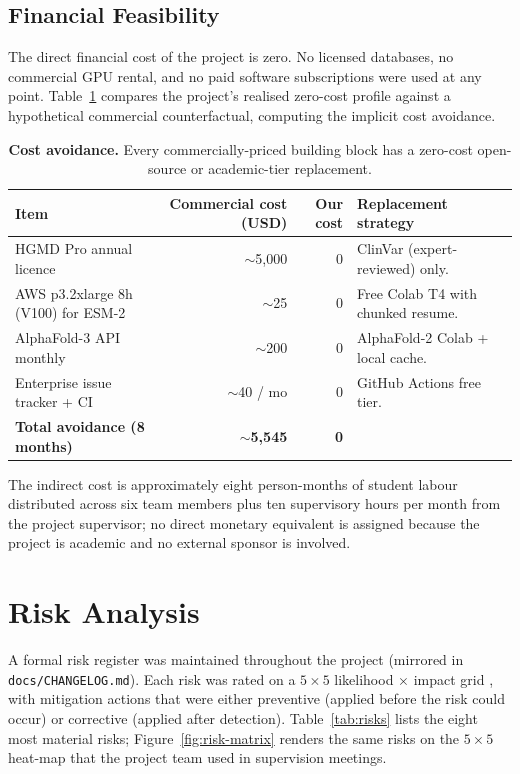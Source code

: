 \documentclass[11pt,a4paper,oneside]{report}
\begin{document}
\subsection{Financial Feasibility}
\label{sec:feas-fin}

The direct financial cost of the project is zero. No
licensed databases, no commercial GPU rental, and no paid
software subscriptions were used at any point.
Table~\ref{tab:tco} compares the project's realised
zero-cost profile against a hypothetical commercial
counterfactual, computing the implicit cost avoidance.

\begin{table}[htbp]
\centering
\footnotesize
\begin{tabularx}{\linewidth}{@{}X r r l@{}}
\toprule
\textbf{Item} & \textbf{Commercial cost (USD)} & \textbf{Our cost} & \textbf{Replacement strategy} \\
\midrule
HGMD Pro annual licence &
$\sim$5{,}000 &
0 &
ClinVar (expert-reviewed) only. \\
AWS p3.2xlarge 8h (V100) for ESM-2 &
$\sim$25 &
0 &
Free Colab T4 with chunked resume. \\
AlphaFold-3 API monthly &
$\sim$200 &
0 &
AlphaFold-2 Colab + local cache. \\
Enterprise issue tracker + CI &
$\sim$40 / mo &
0 &
GitHub Actions free tier. \\
\midrule
\textbf{Total avoidance (8 months)} &
\textbf{$\sim$5{,}545} &
\textbf{0} & \\
\bottomrule
\end{tabularx}
\caption[Cost avoidance]{\textbf{Cost avoidance.} Every
commercially-priced building block has a zero-cost
open-source or academic-tier replacement.}
\label{tab:tco}
\end{table}

The indirect cost is approximately eight person-months of
student labour distributed across six team members plus ten
supervisory hours per month from the project supervisor; no
direct monetary equivalent is assigned because the project
is academic and no external sponsor is involved.

\section{Risk Analysis}
\label{sec:fw-risk}

A formal risk register was maintained throughout the project
(mirrored in \texttt{docs/CHANGELOG.md}). Each risk was
rated on a $5\times 5$ likelihood $\times$ impact grid
\citep{hillson2002risk}, with mitigation actions that were
either preventive (applied before the risk could occur) or
corrective (applied after detection). Table~\ref{tab:risks}
lists the eight most material risks; Figure~\ref{fig:risk-matrix}
renders the same risks on the $5\times 5$ heat-map that the
project team used in supervision meetings.
\end{document}
